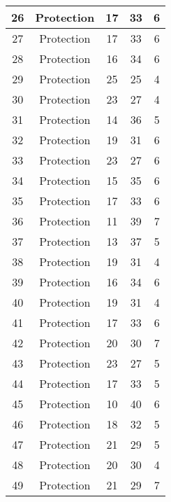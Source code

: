 \documentclass[results.tex]{subfiles}
\begin{document}
\begin{center}
\begin{tabular}{| c || c | c | c | c |}
    \hline
    26 & Protection & 17 & 33 & 6 \\ 
    \hline
    27 & Protection & 17 & 33 & 6 \\ 
    \hline
    28 & Protection & 16 & 34 & 6 \\ 
    \hline
    29 & Protection & 25 & 25 & 4 \\ 
    \hline
    30 & Protection & 23 & 27 & 4 \\ 
    \hline
    31 & Protection & 14 & 36 & 5 \\ 
    \hline
    32 & Protection & 19 & 31 & 6 \\ 
    \hline
    33 & Protection & 23 & 27 & 6 \\ 
    \hline
    34 & Protection & 15 & 35 & 6 \\ 
    \hline
    35 & Protection & 17 & 33 & 6 \\ 
    \hline
    36 & Protection & 11 & 39 & 7 \\ 
    \hline
    37 & Protection & 13 & 37 & 5 \\ 
    \hline
    38 & Protection & 19 & 31 & 4 \\ 
    \hline
    39 & Protection & 16 & 34 & 6 \\ 
    \hline
    40 & Protection & 19 & 31 & 4 \\ 
    \hline
    41 & Protection & 17 & 33 & 6 \\ 
    \hline
    42 & Protection & 20 & 30 & 7 \\ 
    \hline
    43 & Protection & 23 & 27 & 5 \\ 
    \hline
    44 & Protection & 17 & 33 & 5 \\ 
    \hline
    45 & Protection & 10 & 40 & 6 \\ 
    \hline
    46 & Protection & 18 & 32 & 5 \\ 
    \hline
    47 & Protection & 21 & 29 & 5 \\ 
    \hline
    48 & Protection & 20 & 30 & 4 \\ 
    \hline
    49 & Protection & 21 & 29 & 7 \\ 
    \hline   \end{tabular}
\end{center}
\end{document}
